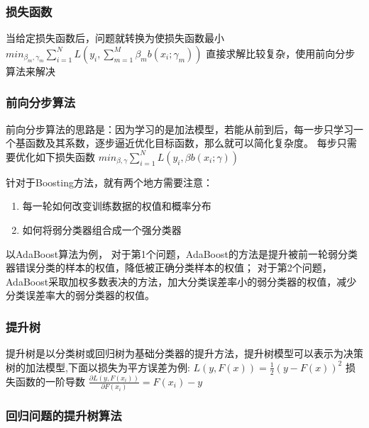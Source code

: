 \documentclass[11pt]{article}
\providecommand{\tightlist}{%
      \setlength{\itemsep}{0pt}\setlength{\parskip}{0pt}}
\begin{document}
    \subsubsection{损失函数}\label{ux635fux5931ux51fdux6570}

当给定损失函数后，问题就转换为使损失函数最小
\(\begin{equation} min_{\beta_m, \gamma_m}\sum^N_{i=1}L(y_i, \sum^M_{m=1}\beta_m b(x_i;\gamma_m)) \label{eq:loss_func} \end{equation}\)
直接求解比较复杂，使用前向分步算法来解决

    \subsubsection{前向分步算法}\label{ux524dux5411ux5206ux6b65ux7b97ux6cd5}

前向分步算法的思路是：因为学习的是加法模型，若能从前到后，每一步只学习一个基函数及其系数，逐步逼近优化目标函数，那么就可以简化复杂度。
每步只需要优化如下损失函数
\(min_{\beta, \gamma}\sum^N_{i=1}L(y_i, \beta b(x_i;\gamma))\)

    

    针对于Boosting方法，就有两个地方需要注意：

\begin{enumerate}
\def\labelenumi{\arabic{enumi}.}
\tightlist
\item
  每一轮如何改变训练数据的权值和概率分布
\item
  如何将弱分类器组合成一个强分类器
\end{enumerate}

以AdaBoost算法为例，
对于第1个问题，AdaBoost的方法是提升被前一轮弱分类器错误分类的样本的权值，降低被正确分类样本的权值；
对于第2个问题，AdaBoost采取加权多数表决的方法，加大分类误差率小的弱分类器的权值，减少分类误差率大的弱分类器的权值。

    \subsubsection{提升树}\label{ux63d0ux5347ux6811}

提升树是以分类树或回归树为基础分类器的提升方法，提升树模型可以表示为决策树的加法模型,下面以损失为平方误差为例:
\(L(y,F(x))=\frac{1}{2}(y-F(x))^2\) 损失函数的一阶导数
\(\frac{\partial L(y,F(x_i))}{\partial F(x_i)} = F(x_i) - y\)

    \subsubsection{回归问题的提升树算法}\label{ux56deux5f52ux95eeux9898ux7684ux63d0ux5347ux6811ux7b97ux6cd5}
\end{document}
